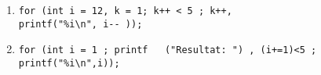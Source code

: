 \begin{multicols}{2}
\begin{enumerate}[label=(\roman*)]
\item \begin{lstlisting}
for (int i = 12, k = 1; k++ < 5 ; k++,
printf("%i\n", i-- ));
\end{lstlisting}

\item \begin{lstlisting}
for (int i = 1 ; printf   ("Resultat: ") , (i+=1)<5 ;
printf("%i\n",i));
\end{lstlisting}

\end{enumerate}

\end{multicols}


